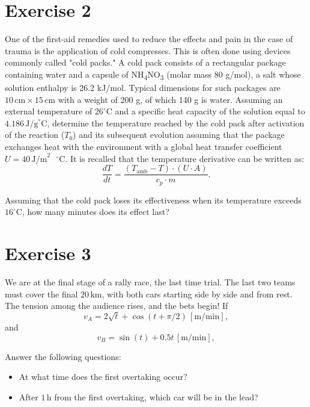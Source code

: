 \documentclass[oneside]{article}
\begin{document}
\section*{Exercise 2}
One of the first-aid remedies used to reduce the effects and pain in the case of trauma
is the application of cold compresses. This is often done using devices commonly called
"cold packs." A cold pack consists of a rectangular package containing water and a
capsule of NH\textsubscript{4}NO\textsubscript{3} (molar mass 80 g/mol), a salt whose
solution enthalpy is 26.2 kJ/mol. Typical dimensions for such packages are $10 \,
\text{cm} \times 15 \, \text{cm}$ with a weight of 200 g, of which 140 g is water.
Assuming an external temperature of $26^\circ \text{C}$ and a specific heat capacity of
the solution equal to $4.186 \, \text{J/g}^\circ\text{C}$, determine the temperature
reached by the cold pack after activation of the reaction ($T_0$) and its subsequent
evolution assuming that the package exchanges heat with the environment with a global
heat transfer coefficient $U = 40 \, \text{J/m}^2\text{ }^\circ\text{C}$. It is recalled
that the temperature derivative can be written as:
\[
\frac{dT}{dt} = \frac{(T_\text{amb} - T) \cdot (U \cdot A)}{c_p \cdot m}.
\]

Assuming that the cold pack loses its effectiveness when its temperature exceeds
$16^\circ \text{C}$, how many minutes does its effect last?

\section*{Exercise 3}
We are at the final stage of a rally race, the last time trial. The last two teams must
cover the final $20 \, \text{km}$, with both cars starting side by side and from rest.
The tension among the audience rises, and the bets begin! If
\[
v_A = 2\sqrt{t} + \cos(t + \pi/2) \, [\text{m/min}],
\]
and
\[
v_B = \sin(t) + 0.5t \, [\text{m/min}],
\]

Answer the following questions:
\begin{itemize}
   \item At what time does the first overtaking occur?
   \item After $1 \, \text{h}$ from the first overtaking, which car will be in the lead?
\end{itemize}
\end{document}
